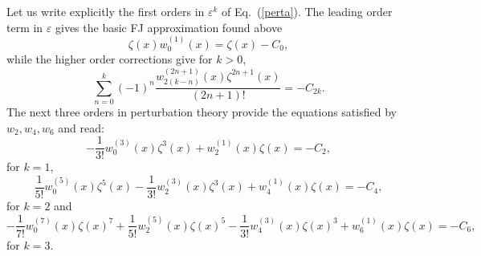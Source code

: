 \documentclass[pre,showpacs,preprintnumbers,amsmath,amssymb,superscriptaddress]{revtex4-1}
\begin{document}
{{Let us write explicitly the first orders in $\varepsilon^k$ of Eq.~(\ref{perta}). The leading order term in $\varepsilon$ gives the basic FJ approximation found above
\begin{equation}
\zeta(x)w_0^{(1)} (x) = \zeta(x)-C_0,\label{ord0}
\end{equation}
while the higher order corrections give for $k>0$,
\begin{equation}
\sum_{n=0}^k (-1)^n\frac{ w_{2(k-n)}^{(2n+1)}(x) \zeta^{2n+1} (x)}{(2n+1)!} = -{C_{2k}}. \label{09431}
\end{equation}
The next three orders in perturbation theory provide the equations satisfied by $w_2,w_4,w_6$ and read:
\begin{equation}
-\frac{1}{3!}w_0^{(3)}(x) \zeta^{3}(x) + w_2^{(1)}(x) \zeta(x)= -{C_2},\label{ord2}
\end{equation}
for $k=1$,
\begin{equation}
\frac{1}{5!}w_0^{(5)}(x) \zeta^{5}(x) - \frac{1}{3!}w_2^{(3)}(x) \zeta^3(x)+ w_4^{(1)}(x) \zeta(x) = -{C_4}, \label{ord4} 
\end{equation}
for $k=2$ and
\begin{equation}
- \frac{1}{7!} w_0^{(7)}(x)\zeta(x)^7 + \frac{1}{5!} w_2^{(5)}(x) \zeta(x)^5 -\frac{1}{3!} w_4^{(3)}(x) \zeta(x)^3 + w_6^{(1)}(x) \zeta(x)  =-C_6, \label{ord6} 
\end{equation}
for $k=3$.

}}
\end{document}
